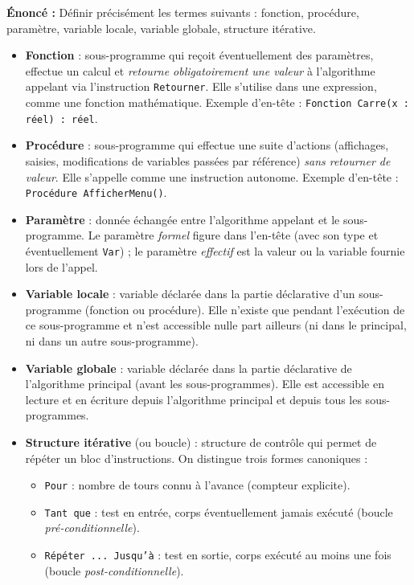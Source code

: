 \documentclass[11pt]{article}
\newcommand{\cle}[1]{{\popxbold\color{popdark}#1}}
\begin{document}
\begin{corrige}
\textbf{Énoncé :} Définir précisément les termes suivants : fonction, procédure, paramètre, variable locale, variable globale, structure itérative.
\tcblower
\begin{itemize}
  \item \textbf{\cle{Fonction}} : sous-programme qui reçoit éventuellement des paramètres, effectue un calcul et \emph{retourne obligatoirement une valeur} à l'algorithme appelant via l'instruction \texttt{Retourner}. Elle s'utilise dans une expression, comme une fonction mathématique. Exemple d'en-tête : \texttt{Fonction Carre(x : réel) : réel}.
  \item \textbf{\cle{Procédure}} : sous-programme qui effectue une suite d'actions (affichages, saisies, modifications de variables passées par référence) \emph{sans retourner de valeur}. Elle s'appelle comme une instruction autonome. Exemple d'en-tête : \texttt{Procédure AfficherMenu()}.
  \item \textbf{\cle{Paramètre}} : donnée échangée entre l'algorithme appelant et le sous-programme. Le paramètre \emph{formel} figure dans l'en-tête (avec son type et éventuellement \texttt{Var}) ; le paramètre \emph{effectif} est la valeur ou la variable fournie lors de l'appel.
  \item \textbf{\cle{Variable locale}} : variable déclarée dans la partie déclarative d'un sous-programme (fonction ou procédure). Elle n'existe que pendant l'exécution de ce sous-programme et n'est accessible nulle part ailleurs (ni dans le principal, ni dans un autre sous-programme).
  \item \textbf{\cle{Variable globale}} : variable déclarée dans la partie déclarative de l'algorithme principal (avant les sous-programmes). Elle est accessible en lecture et en écriture depuis l'algorithme principal et depuis tous les sous-programmes.
  \item \textbf{\cle{Structure itérative}} (ou boucle) : structure de contrôle qui permet de répéter un bloc d'instructions. On distingue trois formes canoniques :
        \begin{itemize}
          \item \texttt{Pour} : nombre de tours connu à l'avance (compteur explicite).
          \item \texttt{Tant que} : test en entrée, corps éventuellement jamais exécuté (boucle \emph{pré-conditionnelle}).
          \item \texttt{Répéter ... Jusqu'à} : test en sortie, corps exécuté au moins une fois (boucle \emph{post-conditionnelle}).
        \end{itemize}
\end{itemize}
\end{corrige}
\end{document}
